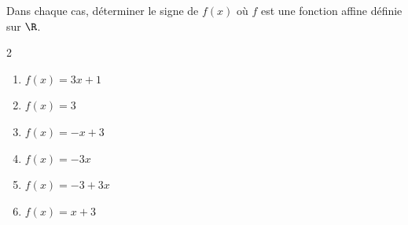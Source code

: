 \begin{exo}{}
	Dans chaque cas, déterminer le signe de $f(x)$ où $f$ est une fonction affine définie sur $\R$.
	\vspace*{-2mm}
	\begin{multicols}{2}
	\begin{enumerate}
		\item $f(x) = 3x + 1$
		\item $f(x) = 3$
		\item $f(x) = -x + 3$
		\item $f(x) = -3x$
		\item $f(x) = -3 + 3x$
		\item $f(x) = x + 3$
	\end{enumerate}
	\end{multicols}
\end{exo}

